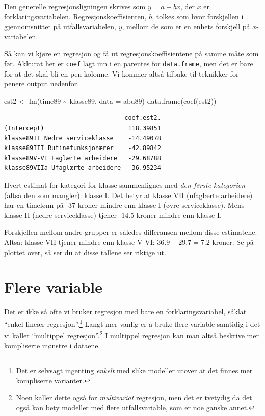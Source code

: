 \documentclass[
  letterpaper,
  DIV=11,
  numbers=noendperiod]{scrreprt}
\newenvironment{Shaded}{\begin{snugshade}}{\end{snugshade}}
\newcommand{\AttributeTok}[1]{\textcolor[rgb]{0.40,0.45,0.13}{#1}}
\newcommand{\FunctionTok}[1]{\textcolor[rgb]{0.28,0.35,0.67}{#1}}
\newcommand{\NormalTok}[1]{\textcolor[rgb]{0.00,0.23,0.31}{#1}}
\newcommand{\OtherTok}[1]{\textcolor[rgb]{0.00,0.23,0.31}{#1}}
\newcommand{\SpecialCharTok}[1]{\textcolor[rgb]{0.37,0.37,0.37}{#1}}
\theoremstyle{definition}
\theoremstyle{remark}
\begin{document}
Den generelle regresjonsligningen skrives som \(y=a+bx\), der \(x\) er
forklaringsvariabelen. Regresjonskoeffisienten, \(b\), tolkes som hvor
forskjellen i gjennomsnittet på utfallsvariabelen, \(y\), mellom de som
er en enhets forskjell på \(x\)-variabelen.

Så kan vi kjøre en regresjon og få ut regresjonskoeffisientene på samme
måte som før. Akkurat her er \texttt{coef} lagt inn i en parentes for
\texttt{data.frame}, men det er bare for at det skal bli en pen kolonne.
Vi kommer altså tilbake til teknikker for penere output nedenfor.

\begin{Shaded}
\begin{Highlighting}[]
\NormalTok{est2 }\OtherTok{\textless{}{-}} \FunctionTok{lm}\NormalTok{(time89 }\SpecialCharTok{\textasciitilde{}}\NormalTok{ klasse89, }\AttributeTok{data =}\NormalTok{ abu89)  }
\FunctionTok{data.frame}\NormalTok{(}\FunctionTok{coef}\NormalTok{(est2)) }
\end{Highlighting}
\end{Shaded}

\begin{verbatim}
                                 coef.est2.
(Intercept)                       118.39851
klasse89II Nedre serviceklasse    -14.49078
klasse89III Rutinefunksjonærer    -42.89842
klasse89V-VI Faglærte arbeidere   -29.68788
klasse89VIIa Ufaglærte arbeidere  -36.95234
\end{verbatim}

Hvert estimat for kategori for klasse sammenlignes med \emph{den første
kategorien} (altså den som mangler): klasse I. Det betyr at klasse VII
(ufaglærte arbeidere) har en timelønn på -37 kroner mindre enn klasse I
(øvre serviceklasse). Mens klasse II (nedre serviceklasse) tjener -14.5
kroner mindre enn klasse I.

Forskjellen mellom andre grupper er således differansen mellom disse
estimatene. Altså: klasse VII tjener mindre enn klasse V-VI:
\(36.9 - 29.7 = 7.2\) kroner. Se på plottet over, så ser du at disse
tallene ser riktige ut.

\hypertarget{flere-variable}{%
\section{Flere variable}\label{flere-variable}}

Det er ikke så ofte vi bruker regresjon med bare en forklaringsvariabel,
såklat ``enkel lineær regresjon''.\footnote{Det er selvsagt ingenting
  \emph{enkelt} med slike modeller utover at det finnes mer kompliserte
  varianter.} Langt mer vanlig er å bruke flere variable samtidig i det
vi kaller ``multippel regresjon''.\footnote{Noen kaller dette også for
  \emph{multivariat} regresjon, men det er tvetydig da det også kan bety
  modeller med flere utfallsvariable, som er noe ganske annet.} I
multippel regresjon kan man altså beskrive mer kompliserte mønstre i
dataene.
\end{document}
